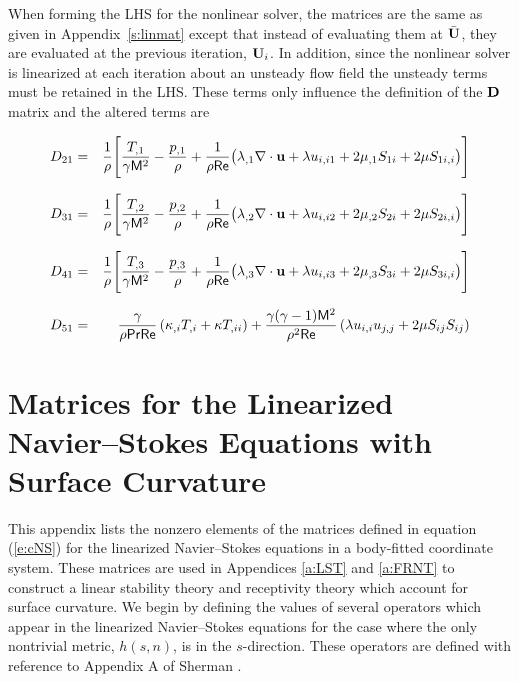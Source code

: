 When forming the LHS for the nonlinear solver, the matrices are the same as
given in Appendix~\ref{s:linmat} except that instead of evaluating them at
$\bar{{\bf U}}$, they are evaluated at the previous iteration, ${\bf U}_{i}$.  In
addition, since the nonlinear solver is linearized at each iteration about an
unsteady flow field the unsteady terms must be retained in the LHS.  These
terms only influence the definition of the ${\bf D}$ matrix and the altered terms
are

\bigskip
{}
%
\begin{eqnarray} 
  D_{21} &=& \frac{1}{\rho} \Bigg[ \frac{ T_{,1}}{\gamma {\sf M}^2} -
             \frac{ p_{,1}}{\rho} + 
             {\frac{1}{\rho{\sf Re}}}\big( \lambda_{,1} {\nabla \cdot {\bf u}} + \lambda  u_{i,i1} + 
             2\mu_{,1}  S_{1i} + 2\mu  S_{1i,i}\big) \Bigg] \\[0.1in]
  D_{31} &=& \frac{1}{\rho} \Bigg[ \frac{ T_{,2}}{\gamma {\sf M}^2} -
             \frac{ p_{,2}}{\rho} + 
             {\frac{1}{\rho{\sf Re}}}\big( \lambda_{,2} {\nabla \cdot {\bf u}} + \lambda  u_{i,i2} + 
             2\mu_{,2}  S_{2i} + 2\mu  S_{2i,i}\big) \Bigg] \\[0.1in]
  D_{41} &=& \frac{1}{\rho} \Bigg[ \frac{ T_{,3}}{\gamma {\sf M}^2} -
             \frac{ p_{,3}}{\rho} + 
             {\frac{1}{\rho{\sf Re}}}\big( \lambda_{,3} {\nabla \cdot {\bf u}} + \lambda  u_{i,i3} + 
             2\mu_{,3}  S_{3i} + 2\mu  S_{3i,i}\big) \Bigg] \\[0.1in]
  D_{51} &=& \frac{\gamma}{\rho{\sf Pr}{\sf Re}} \left( \kappa_{,i} 
              T_{,i} + \kappa  T_{,ii} \right) + 
	     \frac{\gamma(\gamma-1){\sf M}^2}{\rho^2{\sf Re}} 
	     \left( \lambda  u_{i,i} 
	      u_{j,j} + 2 \mu  S_{ij}  S_{ij} \right)
\end{eqnarray}


\pagebreak
\section[Linearized Navier--Stokes Matrices with Surface Curvature] 
{Matrices for the Linearized \protect\\ 
Navier--Stokes Equations with \protect\\ Surface Curvature 
\label{a:curvmat}}

This appendix lists the nonzero elements of the matrices defined in equation
(\ref{e:cNS}) for the linearized Navier--Stokes equations in a body-fitted
coordinate system.  These matrices are used in Appendices \ref{a:LST} and
\ref{a:FRNT} to construct a linear stability theory and receptivity theory
which account for surface curvature.  We begin by defining the values of
several operators which appear in the linearized Navier--Stokes equations for
the case where the only nontrivial metric, $h(s,n)$, is in the $s$-direction.
These operators are defined with reference to Appendix A of Sherman
\cite{Sherman:90}.

